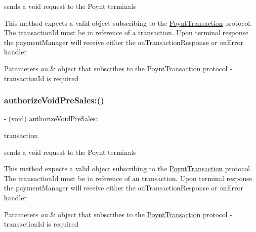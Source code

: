 sends a void request to the Poynt terminals 

This method expects a valid object subscribing to the \hyperlink{class_poynt_transaction-p}{Poynt\+Transaction} protocol. The transaction\+Id must be in reference of a transaction. Upon terminal response the payment\+Manager will receive either the on\+Transaction\+Response or on\+Error handler


\begin{DoxyParams}{Parameters}
{\em an} & object that subscribes to the \hyperlink{class_poynt_transaction-p}{Poynt\+Transaction} protocol -\/ transaction\+Id is required \\
\hline
\end{DoxyParams}
\hypertarget{interface_poynt_p_o_s_connection_manager_a9dbf19579902ee4c67310a2d705381b9}{}\label{interface_poynt_p_o_s_connection_manager_a9dbf19579902ee4c67310a2d705381b9} 
\subsubsection{\texorpdfstring{authorize\+Void\+Pre\+Sales\+:()}{authorizeVoidPreSales:()}}
{\footnotesize\ttfamily -\/ (void) authorize\+Void\+Pre\+Sales\+: \begin{DoxyParamCaption}\item[{(id$<$ Poynt\+Transaction $>$)}]{transaction }\end{DoxyParamCaption}}



sends a void request to the Poynt terminals 

This method expects a valid object subscribing to the \hyperlink{class_poynt_transaction-p}{Poynt\+Transaction} protocol. The transaction\+Id must be in reference of an  transaction. Upon terminal response the payment\+Manager will receive either the on\+Transaction\+Response or on\+Error handler


\begin{DoxyParams}{Parameters}
{\em an} & object that subscribes to the \hyperlink{class_poynt_transaction-p}{Poynt\+Transaction} protocol -\/ transaction\+Id is required \\
\hline
\end{DoxyParams}


